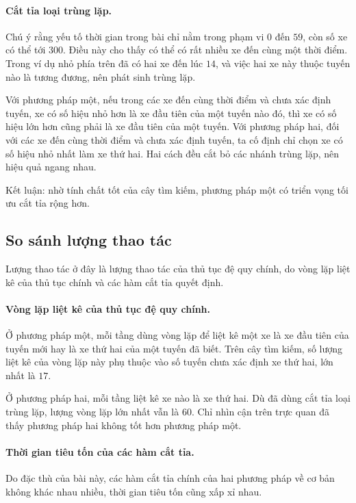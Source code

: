 \documentclass[11pt]{article}
\begin{document}
\paragraph{Cắt tỉa loại trùng lặp.}
Chú ý rằng yếu tố thời gian trong bài chỉ nằm trong phạm vi $0$ đến $59$, còn
số xe có thể tới $300$. Điều này cho thấy có thể có rất nhiều xe đến cùng một
thời điểm. Trong ví dụ nhỏ phía trên đã có hai xe đến lúc $14$, và việc hai xe
này thuộc tuyến nào là tương đương, nên phát sinh trùng lặp.

Với phương pháp một, nếu trong các xe đến cùng thời điểm và chưa xác định
tuyến, xe có số hiệu nhỏ hơn là xe đầu tiên của một tuyến nào đó, thì xe có số
hiệu lớn hơn cũng phải là xe đầu tiên của một tuyến. Với phương pháp hai, đối
với các xe đến cùng thời điểm và chưa xác định tuyến, ta cố định chỉ chọn xe
có số hiệu nhỏ nhất làm xe thứ hai. Hai cách đều cắt bỏ các nhánh trùng lặp,
nên hiệu quả ngang nhau.

Kết luận: nhờ tính chất tốt của cây tìm kiếm, phương pháp một có triển vọng
tối ưu cắt tỉa rộng hơn.

\subsection{So sánh lượng thao tác}

Lượng thao tác ở đây là lượng thao tác của thủ tục đệ quy chính, do vòng lặp
liệt kê của thủ tục chính và các hàm cắt tỉa quyết định.

\paragraph{Vòng lặp liệt kê của thủ tục đệ quy chính.}
Ở phương pháp một, mỗi tầng dùng vòng lặp để liệt kê một xe là xe đầu tiên của
tuyến mới hay là xe thứ hai của một tuyến đã biết. Trên cây tìm kiếm, số lượng
liệt kê của vòng lặp này phụ thuộc vào số tuyến chưa xác định xe thứ hai, lớn
nhất là $17$.

Ở phương pháp hai, mỗi tầng liệt kê xe nào là xe thứ hai. Dù đã dùng cắt tỉa
loại trùng lặp, lượng vòng lặp lớn nhất vẫn là $60$. Chỉ nhìn cận trên trực
quan đã thấy phương pháp hai không tốt hơn phương pháp một.

\paragraph{Thời gian tiêu tốn của các hàm cắt tỉa.}
Do đặc thù của bài này, các hàm cắt tỉa chính của hai phương pháp về cơ bản
không khác nhau nhiều, thời gian tiêu tốn cũng xấp xỉ nhau.
\end{document}
